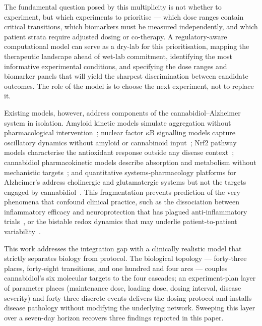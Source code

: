 \documentclass[10pt,letterpaper]{article}
\begin{document}
The fundamental question posed by this multiplicity is not whether to experiment, but which experiments to prioritise --- which dose ranges contain critical transitions, which biomarkers must be measured independently, and which patient strata require adjusted dosing or co-therapy. A regulatory-aware computational model can serve as a dry-lab for this prioritisation, mapping the therapeutic landscape ahead of wet-lab commitment, identifying the most informative experimental conditions, and specifying the dose ranges and biomarker panels that will yield the sharpest discrimination between candidate outcomes. The role of the model is to choose the next experiment, not to replace it.

Existing models, however, address components of the cannabidiol--Alzheimer system in isolation. Amyloid kinetic models simulate aggregation without pharmacological intervention~\cite{proctor2010,kyrtsos2015}; nuclear factor $\kappa$B signalling models capture oscillatory dynamics without amyloid or cannabinoid input~\cite{hoffmann2002}; Nrf2 pathway models characterise the antioxidant response outside any disease context~\cite{zhang2017}; cannabidiol pharmacokinetic models describe absorption and metabolism without mechanistic targets~\cite{zgair2016,millar2018}; and quantitative systems-pharmacology platforms for Alzheimer's address cholinergic and glutamatergic systems but not the targets engaged by cannabidiol~\cite{geerts2016}. This fragmentation prevents prediction of the very phenomena that confound clinical practice, such as the dissociation between inflammatory efficacy and neuroprotection that has plagued anti-inflammatory trials~\cite{heneka2015}, or the bistable redox dynamics that may underlie patient-to-patient variability~\cite{cassano2020,watt2017}.

This work addresses the integration gap with a clinically realistic model that strictly separates biology from protocol. The biological topology --- forty-three places, forty-eight transitions, and one hundred and four arcs --- couples cannabidiol's six molecular targets to the four cascades; an experiment-plan layer of parameter places (maintenance dose, loading dose, dosing interval, disease severity) and forty-three discrete events delivers the dosing protocol and installs disease pathology without modifying the underlying network. Sweeping this layer over a seven-day horizon recovers three findings reported in this paper.
\end{document}
